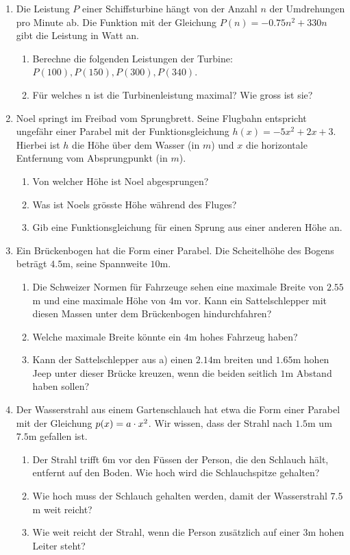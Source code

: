 \documentclass[11pt,oneside]{article}
\begin{document}
	\begin{aufgabe}
		\begin{enumerate}
			\item Die Leistung $P$ einer Schiﬀsturbine hängt von der Anzahl $n$ der Umdrehungen pro Minute ab. Die Funktion mit der Gleichung $P(n)=-0.75n^2+330n$ gibt die Leistung in Watt an.
			\begin{enumerate}[label=\alph*)]
				\item Berechne die folgenden Leistungen der Turbine: $P(100), P(150), P(300), P(340)$.
				\item Für welches n ist die Turbinenleistung maximal? Wie gross ist sie?
			\end{enumerate}
			\item  Noel springt im Freibad vom Sprungbrett. Seine Flugbahn entspricht ungefähr einer Parabel mit der Funktionsgleichung $h(x)=-5x^2+2x+3$. Hierbei ist $h$ die Höhe über dem Wasser (in $m$) und $x$ die horizontale Entfernung vom Absprungpunkt (in $m$).
			\begin{enumerate}[label=\alph*)]
				\item Von welcher Höhe ist Noel abgesprungen?
				\item Was ist Noels grösste Höhe während des Fluges?
				\item Gib eine Funktionsgleichung für einen Sprung aus einer anderen Höhe an.
			\end{enumerate}
			\item Ein Brückenbogen hat die Form einer Parabel. Die Scheitelhöhe des Bogens beträgt $4.5$m, seine Spannweite $10$m.
			\begin{enumerate}[label=\alph*)]
				\item Die Schweizer Normen für Fahrzeuge sehen eine maximale Breite von $2.55$m und eine maximale Höhe von $4$m vor. Kann ein Sattelschlepper mit diesen Massen unter dem Brückenbogen hindurchfahren?
				\item Welche maximale Breite könnte ein $4$m hohes Fahrzeug haben?
				\item Kann der Sattelschlepper aus a) einen $2.14$m breiten und $1.65$m hohen Jeep unter dieser Brücke kreuzen, wenn die beiden seitlich $1$m Abstand haben sollen?
			\end{enumerate}
			\item Der Wasserstrahl aus einem Gartenschlauch hat etwa die Form einer Parabel mit der Gleichung $p(x)=a\cdot x^2$. Wir wissen, dass der Strahl nach $1.5$m um $7.5$m gefallen ist.
			\begin{enumerate}[label=\alph*)]
				\item Der Strahl trifft $6$m vor den Füssen der Person, die den Schlauch hält, entfernt auf den Boden. Wie hoch wird die Schlauchspitze gehalten?
				\item Wie hoch muss der Schlauch gehalten werden, damit der Wasserstrahl $7.5$m weit reicht?
				\item Wie weit reicht der Strahl, wenn die Person zusätzlich auf einer $3$m hohen Leiter steht?
			\end{enumerate}
		\end{enumerate}
	\end{aufgabe}
\end{document}
